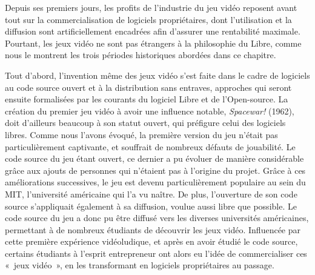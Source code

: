 \documentclass{FramateX}
\begin{document}
\begin{refsection}
Depuis ses premiers jours, les profits de l'industrie du jeu vidéo
reposent avant tout sur la commercialisation de logiciels
propriétaires, dont l'utilisation et la diffusion sont artificiellement
encadrées afin d'assurer une rentabilité maximale. Pourtant, les jeux
vidéo ne sont pas étrangers à la philosophie du Libre, comme nous le
montrent les trois périodes historiques abordées dans ce chapitre. 

Tout d'abord, l'invention même des jeux vidéo s'est faite dans le cadre
de logiciels au code source ouvert et à la distribution sans entraves,
approches qui seront ensuite formalisées par les courants du logiciel
Libre et de l'Open-source. La création du premier jeu vidéo à avoir une
influence notable, \textit{Spacewar!} (1962), doit d'ailleurs beaucoup à
son statut ouvert, qui préfigure celui des logiciels libres. Comme nous
l'avons évoqué, la première version du jeu n'était pas particulièrement
captivante, et souffrait de nombreux défauts de jouabilité. Le code
source du jeu étant ouvert, ce dernier a pu évoluer de manière
considérable grâce aux ajouts de personnes qui n'étaient pas à
l'origine du projet. Grâce à ces améliorations successives, le jeu est
devenu particulièrement populaire au sein du MIT, l'université
américaine qui l'a vu naître. De plus, l'ouverture de son code source
s'appliquait également à sa diffusion, voulue aussi libre que possible.
Le code source du jeu a donc pu être diffusé vers les diverses
universités américaines, permettant à de nombreux étudiants de
découvrir les jeux vidéo. Influencée par cette première expérience
vidéoludique, et après en avoir étudié le code source, certains
étudiants à l'esprit entrepreneur ont alors eu l'idée de commercialiser
ces «~jeux vidéo~», en les transformant en logiciels propriétaires au
passage.


\end{refsection}
\end{document}
